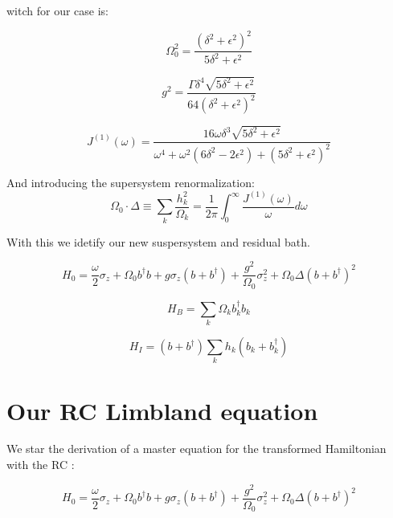 \documentclass[%
preprint,
onecolumn,
notitlepag,
 amsmath,amssymb,
 aps,
 pra,
]{revtex4-2}
\begin{document}
witch for our case is: 

\begin{equation}
\Omega_{0}^{2}=\frac{\left(\delta^{2}+\epsilon^{2}\right)^{2}}{5 \delta^{2}+\epsilon^{2}}
\end{equation}

\begin{equation}
g^{2}=\frac{\Gamma \delta^{4} \sqrt{5 \delta^{2}+\epsilon^{2}}}{64\left(\delta^{2}+\epsilon^{2}\right)^{2}}
\end{equation}

\begin{equation}
J^{(1)}(\omega)=\frac{16 \omega \delta^{3} \sqrt{5 \delta^{2}+\epsilon^{2}}}{\omega^{4}+\omega^{2}\left(6 \delta^{2}-2 \epsilon^{2}\right)+\left(5 \delta^{2}+\epsilon^{2}\right)^{2}}
\end{equation}

 And introducing the supersystem renormalization: 
$$
\Omega_{0} \cdot \Delta \equiv \sum_{k} \frac{h_{k}^{2}}{\Omega_{k}}=\frac{1}{2 \pi} \int_{0}^{\infty} \frac{J^{(1)}(\omega)}{\omega} d \omega
$$

With this we idetify our new suspersystem and residual bath. 




\begin{equation}
    H_0= \frac{\omega}{2} \sigma_z +  \Omega_0 b ^{\dagger} b +g \sigma_z  \left( b + b ^{\dagger} \right) + \frac{g^2}{\Omega_0} \sigma_z^2 + \Omega_0 \Delta \left( b + b ^{\dagger} \right)^2
\end{equation}

\begin{equation}
    H_B= \sum_{k} \Omega_k b_k ^{\dagger} b_k
\end{equation}    

\begin{equation}
    H_I= \left( b + b ^{\dagger} \right) \sum_k h_k \left( b_k + b_k ^{\dagger} \right)
\end{equation}



\section*{Our RC Limbland equation}


We star the derivation of a master equation for the transformed Hamiltonian with the RC  :

\begin{equation}
    H_0= \frac{\omega}{2} \sigma_z +  \Omega_0 b ^{\dagger} b +g \sigma_z  \left( b + b ^{\dagger} \right) + \frac{g^2}{\Omega_0} \sigma_z^2 + \Omega_0 \Delta \left( b + b ^{\dagger} \right)^2
\end{equation}
\end{document}

